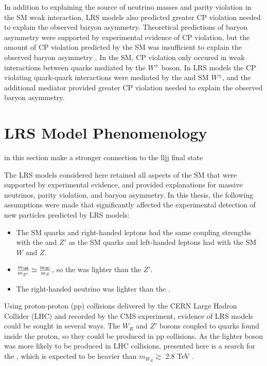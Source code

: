 In addition to explaining the source of neutrino masses and parity violation in the SM weak interaction, 
LRS models also predicted greater CP violation needed to explain the observed baryon asymmetry.  
Theoretical predictions of baryon asymmetry \cite{saharov} were supported by experimental evidence of CP violation, 
but the amount of CP violation predicted by the SM was insufficient to explain the observed baryon asymmetry \cite{surveyOfExtensions}.  
In the SM, CP violation only occured in weak interactions between quarks mediated by the $W^{\pm}$ boson.  
In LRS models the CP violating quark-quark interactions were mediated by the \WR and SM $W^{\pm}$, and the 
additional \WR mediator provided greater CP violation needed to explain the observed baryon asymmetry.


\section{LRS Model Phenomenology}
\label{sec:lrsPhenomenology}
in this section make a stronger connection to the lljj final state

The LRS models considered here retained all aspects of the SM that were supported by experimental 
evidence, and provided explanations for massive neutrinos, parity violation, and baryon asymmetry.  
In this thesis, the following assumptions were made that significantly affected the experimental 
detection of new particles predicted by LRS models:

\begin{itemize}
	\item The SM quarks and right-handed leptons had the same coupling strengths with the \WR and $Z'$ 
		as the SM quarks and left-handed leptons had with the SM $W$ and $Z$.
	\item $\frac{m_{\WR}}{m_{Z'}} \simeq \frac{m_{W}}{m_{Z}}$, so the \WR was lighter than the $Z'$.
	\item The right-handed neutrino \nul was lighter than the \WR.
\end{itemize}

Using proton-proton (pp) collisions delivered by the CERN Large Hadron Collider (LHC) and recorded 
by the CMS experiment, evidence of LRS models could be sought in several ways.  The $W_{R}$ and $Z'$ 
bosons coupled to quarks found inside the proton, so they 
could be produced in pp collisions.  As the lighter boson was more likely to be 
produced in LHC collisions, presented here is a search for the \WR, which is expected to be heavier than 
$m_{W_{R}} \gtrsim$ 2.8 TeV \cite{cmsWRRunOneResults}.

